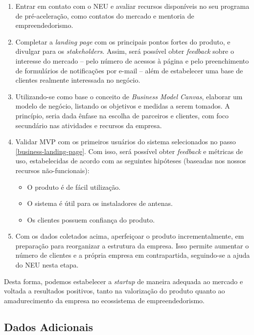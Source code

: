 \documentclass[]{politex}
\begin{document}
\begin{enumerate}
\item Entrar em contato com o NEU e avaliar recursos disponíveis no seu
programa de pré-aceleração, como contatos do mercado e mentoria de
empreendedorismo.
\item\label{business-landing-page} Completar a \textit{landing page} com os
principais pontos fortes do produto, e divulgar para os \textit{stakeholders}.
Assim, será possível obter \textit{feedback} sobre o interesse do mercado --
pelo número de acessos à página e pelo preenchimento de formulários de
notificações por e-mail -- além de estabelecer uma base de clientes realmente
interessada no negócio.
\item Utilizando-se como base o conceito de \textit{Business Model Canvas},
elaborar um modelo de negócio, listando os objetivos e medidas a serem tomados.
A princípio, seria dada ênfase na escolha de parceiros e clientes, com foco
secundário nas atividades e recursos da empresa.
\item Validar MVP com os primeiros usuários do sistema selecionados no passo
\ref{business-landing-page}. Com isso, será possível obter \textit{feedback} e
métricas de uso, estabelecidas de acordo com as seguintes hipóteses (baseadas
nos nossos recursos não-funcionais):
\begin{itemize}
\item O produto é de fácil utilização.
\item O sistema é útil para os instaladores de antenas.
\item Os clientes possuem confiança do produto.
\end{itemize}
\item Com os dados coletados acima, aperfeiçoar o produto incrementalmente, em
preparação para reorganizar a estrutura da empresa. Isso permite aumentar o
número de clientes e a própria empresa em contrapartida, seguindo-se a ajuda
do NEU nesta etapa.
\end{enumerate}

Desta forma, podemos estabelecer a \textit{startup} de maneira adequada ao
mercado e voltada a resultados positivos, tanto na valorização do produto quanto
ao amadurecimento da empresa no ecossistema de empreendedorismo.

\subsection{Dados Adicionais}
\end{document}
